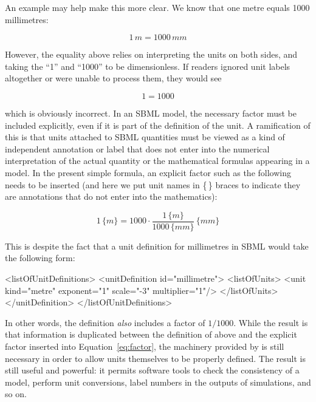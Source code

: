 An example may help make this more clear.  We know that one metre
equals 1000 millimetres:
\begin{linenomath}
  \begin{equation*}
    1\, m = 1000\, mm
  \end{equation*}
\end{linenomath}
However, the equality above relies on interpreting the units on
both sides, and taking the ``1'' and ``1000'' to be dimensionless.
If readers ignored unit labels altogether or were unable to
process them, they would see
\begin{linenomath}
  \begin{equation*}
    1 = 1000
  \end{equation*}
\end{linenomath}
which is obviously incorrect.  In an SBML model, the necessary
factor must be included explicitly, even if it is part of the
definition of the unit.  A ramification of this is that units
attached to SBML quantities must be viewed as a kind of
independent annotation or label that does not enter into the
numerical interpretation of the actual quantity or the
mathematical formulas appearing in a model.  In the present simple
formula, an explicit factor such as the following needs to be
inserted (and here we put unit names in \{$\,$\} braces to
indicate they are annotations that do not enter into the
mathematics):
\begin{linenomath}
  \begin{equation}\label{eq:factor}
    1 \, \{m\} = 1000 \cdot \frac{1 \, \{m\}}{1000 \, \{mm\}} \, \{mm\}
  \end{equation}
\end{linenomath}
This is despite the fact that a unit definition for millimetres in SBML
would take the following form:
\begin{example}
<listOfUnitDefinitions>
    <unitDefinition id="millimetre">
        <listOfUnits>
            <unit kind="metre" exponent="1" scale="-3" multiplier="1"/>
        </listOfUnits>
    </unitDefinition>
</listOfUnitDefinitions>
\end{example}

In other words, the definition \emph{also} includes a factor of
$1/1000$.  While the result is that information is duplicated
between the definition of  above and the
explicit factor inserted into Equation~\ref{eq:factor}, the
machinery provided by \UnitDefinition is still necessary in order
to allow units themselves to be properly defined.  The result is
still useful and powerful: it permits software tools to check the
consistency of a model, perform unit conversions, label numbers in
the outputs of simulations, and so on.


